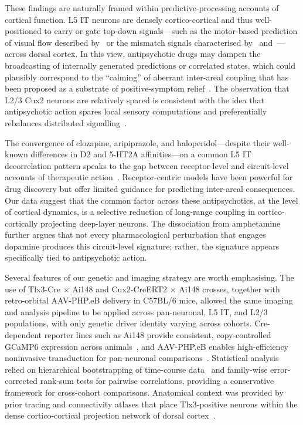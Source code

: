 \documentclass[11pt]{article}
\begin{document}
These findings are naturally framed within predictive-processing accounts of cortical function. L5 IT neurons are densely cortico-cortical and thus well-positioned to carry or gate top-down signals---such as the motor-based prediction of visual flow described by~\citet{leinweber2017sensorimotor} or the mismatch signals characterised by~\citet{keller2012sensorimotor} and~\citet{zmarz2016mismatch}---across dorsal cortex. In this view, antipsychotic drugs may dampen the broadcasting of internally generated predictions or correlated states, which could plausibly correspond to the ``calming'' of aberrant inter-areal coupling that has been proposed as a substrate of positive-symptom relief~\citep{uhlhaas2015oscillations, uhlhaas2013highfrequency, bahner2017hippocampal}. The observation that L2/3 Cux2 neurons are relatively spared is consistent with the idea that antipsychotic action spares local sensory computations and preferentially rebalances distributed signalling~\citep{harris2019hierarchical, siegle2021survey, keller2018predictive}.

The convergence of clozapine, aripiprazole, and haloperidol---despite their well-known differences in D2 and 5-HT2A affinities---on a common L5 IT decorrelation pattern speaks to the gap between receptor-level and circuit-level accounts of therapeutic action~\citep{howes2009dopamine, kambeitz2014alterations}. Receptor-centric models have been powerful for drug discovery but offer limited guidance for predicting inter-areal consequences. Our data suggest that the common factor across these antipsychotics, at the level of cortical dynamics, is a selective reduction of long-range coupling in cortico-cortically projecting deep-layer neurons. The dissociation from amphetamine further argues that not every pharmacological perturbation that engages dopamine produces this circuit-level signature; rather, the signature appears specifically tied to antipsychotic action.

Several features of our genetic and imaging strategy are worth emphasising. The use of Tlx3-Cre $\times$ Ai148 and Cux2-CreERT2 $\times$ Ai148 crosses, together with retro-orbital AAV-PHP.eB delivery in C57BL/6 mice, allowed the same imaging and analysis pipeline to be applied across pan-neuronal, L5 IT, and L2/3 populations, with only genetic driver identity varying across cohorts. Cre-dependent reporter lines such as Ai148 provide consistent, copy-controlled GCaMP6 expression across animals~\citep{daigle2018suite, chen2013ultrasensitive, bounds2023alloptical}, and AAV-PHP.eB enables high-efficiency noninvasive transduction for pan-neuronal comparisons~\citep{chan2017engineered}. Statistical analysis relied on hierarchical bootstrapping of time-course data~\citep{saravanan2020hierarchical} and family-wise error-corrected rank-sum tests for pairwise correlations, providing a conservative framework for cross-cohort comparisons. Anatomical context was provided by prior tracing and connectivity atlases that place Tlx3-positive neurons within the dense cortico-cortical projection network of dorsal cortex~\citep{liu2024celltype, harris2019hierarchical, matho2021genetic, biccn2021multimodal}.
\end{document}
